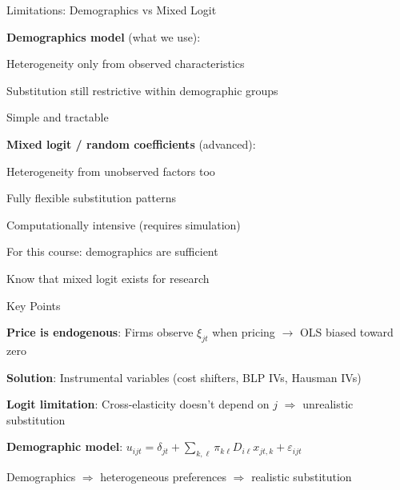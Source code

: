 \documentclass[notes,11pt, aspectratio=169]{beamer}
\newenvironment{wideitemize}{\itemize\addtolength{\itemsep}{10pt}}{\enditemize}
\newenvironment{wideenumerate}{\enumerate\addtolength{\itemsep}{10pt}}{\endenumerate}
\begin{document}
\begin{frame}{Limitations: Demographics vs Mixed Logit}
	\begin{wideitemize}
		\item \textbf{Demographics model} (what we use):
		\begin{wideitemize}
			\vspace{5pt}
			\item Heterogeneity only from observed characteristics
			\item Substitution still restrictive within demographic groups
			\item Simple and tractable
		\end{wideitemize}
		\item \textbf{Mixed logit / random coefficients} (advanced):
		\begin{wideitemize}
			\vspace{5pt}
			\item Heterogeneity from unobserved factors too
			\item Fully flexible substitution patterns
			\item Computationally intensive (requires simulation)
		\end{wideitemize}
		\item For this course: demographics are sufficient
		\item Know that mixed logit exists for research
	\end{wideitemize}
\end{frame}


\begin{frame}{Key Points}
	\vspace{11pt}
	\begin{wideenumerate}
		\item \textbf{Price is endogenous}: Firms observe $\xi_{jt}$ when pricing $\rightarrow$ OLS biased toward zero
		\item \textbf{Solution}: Instrumental variables (cost shifters, BLP IVs, Hausman IVs)
		\item \textbf{Logit limitation}: Cross-elasticity doesn't depend on $j$ $\Rightarrow$ unrealistic substitution
		\item \textbf{Demographic model}: $u_{ijt} = \delta_{jt} + \sum_{k,\ell} \pi_{k\ell} D_{i\ell} x_{jt,k} + \varepsilon_{ijt}$
		\item Demographics $\Rightarrow$ heterogeneous preferences $\Rightarrow$ realistic substitution
	\end{wideenumerate}
\end{frame}
\end{document}
